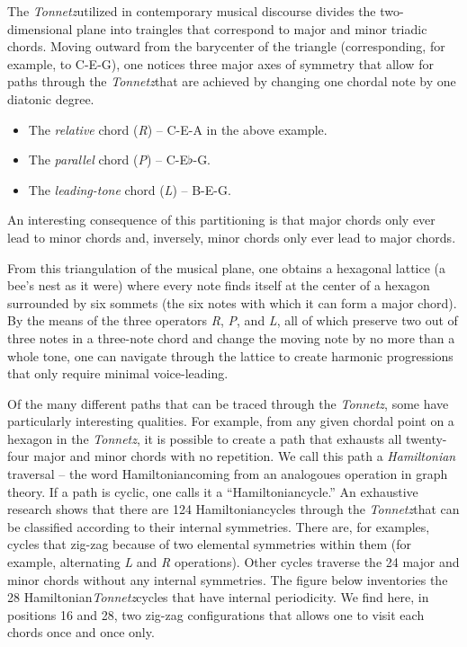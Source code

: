 \documentclass{article}
\newcommand{\Tonnetz}{\emph{Tonnetz}}
\newcommand{\Hamiltonian}{Hamiltonian}
\begin{document}
The \Tonnetz utilized in contemporary musical discourse divides the
two-dimensional plane into traingles that correspond to major and minor
triadic chords.  Moving outward from the barycenter of the triangle
(corresponding, for example, to C-E-G), one notices three major axes of
symmetry that allow for paths through the \Tonnetz that are achieved
by changing one chordal note by one diatonic degree.
\begin{itemize}
\item The \emph{relative} chord (\emph{R}) -- C-E-A in the
above example.
\item The \emph{parallel} chord (\emph{P}) --
C-E$\flat$-G.
\item The \emph{leading-tone} chord (\emph{L}) --
B-E-G.
\end{itemize}
An interesting consequence of this partitioning is that major chords only
ever lead to minor chords and, inversely, minor chords only ever lead to
major chords.

From this triangulation of the musical plane, one obtains a hexagonal
lattice (a bee's nest as it were) where every note finds itself at the
center of a hexagon surrounded by six sommets (the six notes with which it
can form a major chord).  By the means of the three operators \emph{R},
\emph{P}, and \emph{L}, all of which preserve two out of three notes in a
three-note chord and change the moving note by no more than a whole tone,
one can navigate through the lattice to create harmonic progressions that
only require minimal voice-leading.

Of the many different paths that can be traced through the \Tonnetz,
some have particularly interesting qualities.  For example, from any given
chordal point on a hexagon in the \Tonnetz, it is possible to create a
path that exhausts all twenty-four major and minor chords with no
repetition.  We call this path a \emph{\Hamiltonian} traversal -- the word
\Hamiltonian coming from an analogoues operation in graph theory.  If a path
is cyclic, one calls it a ``\Hamiltonian cycle.''  An exhaustive research
shows that there are 124 \Hamiltonian cycles through the \Tonnetz that can be
classified according to their internal symmetries.  There are, for examples,
cycles that zig-zag because of two elemental symmetries within them (for
example, alternating \emph{L} and \emph{R} operations).  Other cycles
traverse the 24 major and minor chords without any internal symmetries.  The
figure below inventories the 28 \Hamiltonian \Tonnetz cycles that have
internal periodicity.  We find here, in positions 16 and 28, two zig-zag
configurations that allows one to visit each chords once and once only.
\end{document}
